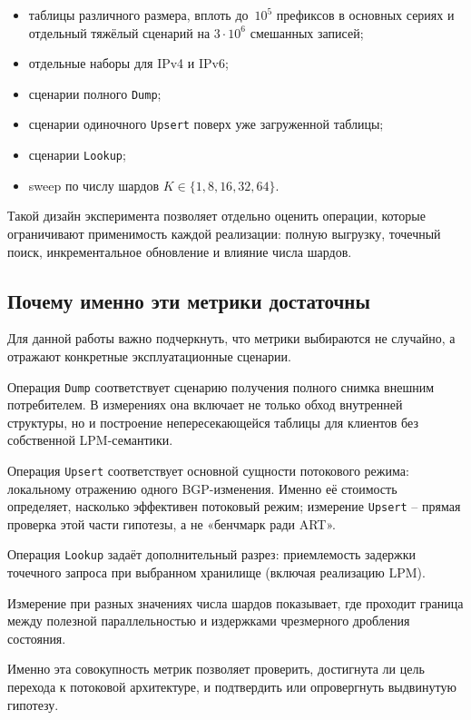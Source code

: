 \begin{itemize}
\item таблицы различного размера, вплоть до~$10^5$ префиксов в основных
сериях и отдельный тяжёлый сценарий на $3\cdot10^6$ смешанных записей;
\item отдельные наборы для IPv4 и IPv6;
\item сценарии полного \texttt{Dump};
\item сценарии одиночного \texttt{Upsert} поверх уже загруженной
таблицы;
\item сценарии \texttt{Lookup};
\item sweep по числу шардов $K \in \{1,8,16,32,64\}$.
\end{itemize}

Такой дизайн эксперимента позволяет отдельно оценить операции, которые
ограничивают применимость каждой реализации: полную выгрузку, точечный
поиск, инкрементальное обновление и влияние числа шардов.

\subsection{Почему именно эти метрики достаточны}

Для данной работы важно подчеркнуть, что метрики выбираются не
случайно, а отражают конкретные эксплуатационные сценарии.

Операция \texttt{Dump} соответствует сценарию получения полного снимка
внешним потребителем. В измерениях она включает не только обход
внутренней структуры, но и построение непересекающейся таблицы для
клиентов без собственной LPM-семантики.

Операция \texttt{Upsert} соответствует основной сущности потокового
режима: локальному отражению одного BGP-изменения. Именно её стоимость
определяет, насколько эффективен потоковый режим;
измерение \texttt{Upsert} -- прямая проверка этой части гипотезы, а не
«бенчмарк ради ART».

Операция \texttt{Lookup} задаёт дополнительный разрез: приемлемость
задержки точечного запроса при выбранном хранилище (включая реализацию
LPM).

Измерение при разных значениях числа шардов показывает, где проходит
граница между полезной параллельностью и издержками чрезмерного дробления
состояния.

Именно эта совокупность метрик позволяет проверить, достигнута ли
цель перехода к потоковой архитектуре, и подтвердить или
опровергнуть выдвинутую гипотезу.


